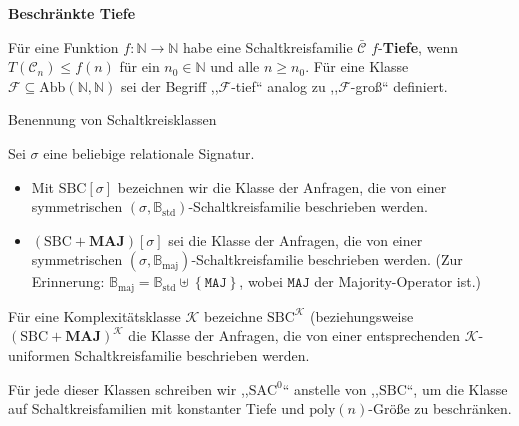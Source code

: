 \begin{defn}
\textbf{Beschränkte Tiefe}

Für eine Funktion $f:\mathbb{N}\rightarrow\mathbb{N}$ habe eine Schaltkreisfamilie
$\bar{\mathcal{C}}$ $f$-\textbf{Tiefe}, wenn $T\left(\mathcal{C}_{n}\right)\leqslant f\left(n\right)$
für ein $n_{0}\in\mathbb{N}$ und alle $n\geqslant n_{0}$. Für eine
Klasse $\mathcal{F}\subseteq\mathrm{Abb}\left(\mathbb{N},\mathbb{N}\right)$
sei der Begriff ,,$\mathcal{F}$-tief`` analog zu ,,$\mathcal{F}$-groß``
definiert.
\end{defn}
%
\begin{defn}
Benennung von Schaltkreisklassen

Sei $\sigma$ eine beliebige relationale Signatur.

\begin{itemize}
\item Mit $\mathrm{SBC}\left[\sigma\right]$ bezeichnen wir die Klasse der
Anfragen, die von einer symmetrischen\textbf{ $\left(\sigma,\mathbb{B}_{\mathrm{std}}\right)$}-Schaltkreisfamilie
beschrieben werden.
\item $\left(\mathrm{SBC}+\mathbf{MAJ}\right)\left[\sigma\right]$ sei die
Klasse der Anfragen, die von einer symmetrischen\textbf{ $\left(\sigma,\mathbb{B}_{\mathrm{maj}}\right)$}-Schaltkreisfamilie
beschrieben werden. (Zur Erinnerung: $\mathbb{B}_{\mathrm{maj}}=\mathbb{B}_{\mathrm{std}}\uplus\left\{ \mathtt{MAJ}\right\} $,
wobei $\mathtt{MAJ}$ der Majority-Operator ist.)
\end{itemize}
Für eine Komplexitätsklasse $\mathcal{K}$ bezeichne $\mathrm{SBC}^{\mathcal{K}}$
(beziehungsweise $\left(\mathrm{SBC}+\mathbf{MAJ}\right)^{\mathcal{K}}$
die Klasse der Anfragen, die von einer entsprechenden $\mathcal{K}$-uniformen
Schaltkreisfamilie beschrieben werden.

Für jede dieser Klassen schreiben wir ,,$\mathrm{SAC}^{0}$`` anstelle
von ,,$\mathrm{SBC}$``, um die Klasse auf Schaltkreisfamilien mit
konstanter Tiefe und $\mathrm{poly}\left(n\right)$-Größe zu beschränken.
\end{defn}


